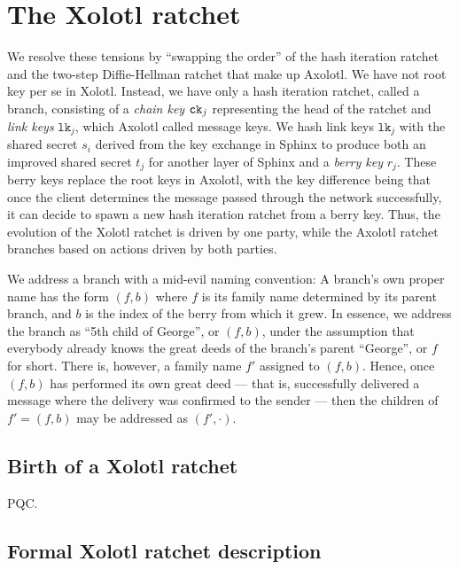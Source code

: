 \documentclass[twoside,letterpaper]{llncs}
\begin{document}
\section{The Xolotl ratchet}

\def\cn{\texttt{cn}}
\def\DH{\texttt{DH}}
\def\lk{\texttt{lk}}
\def\sk{\texttt{sk}}
\def\ECDH{\textrm{ECDH}}

We resolve these tensions by ``swapping the order'' of the hash
iteration ratchet and the two-step Diffie-Hellman ratchet that make
up Axolotl.   
%
We have not root key per se in Xolotl.  
Instead, we have only a hash iteration ratchet, called a branch,
consisting of a {\it chain key} $\texttt{ck}_j$ representing the head of the
ratchet and {\it link keys} $\lk_j$, which Axolotl called message
keys.  We hash link keys $\lk_j$ with the shared secret $s_i$
derived from the key exchange in Sphinx to produce both an improved
shared secret $t_j$ for another layer of Sphinx and a {\it berry key} $r_j$. 
These berry keys replace the root keys in Axolotl, with the key difference
being that once the
client determines the message passed through the network successfully,
it can decide to spawn a new hash iteration ratchet from a berry key.
Thus, the evolution of the Xolotl ratchet is driven by one party, while
the Axolotl ratchet branches based on actions driven by both parties.

We address a branch with a mid-evil naming convention: A branch's own
proper name has the form $(f,b)$ where $f$ is its family name
determined by its parent branch, and $b$ is the index of the berry
from which it grew.  In essence, we address the branch as ``5th child
of George'', or $(f,b)$, under the assumption that everybody already
knows the great deeds of the branch's parent ``George'', or $f$ for
short.  There is, however, a family name $f'$ assigned to $(f,b)$.
Hence, once $(f,b)$ has performed its own great deed --- that is,
successfully delivered a message where the delivery was confirmed to
the sender --- then the children of $f' = (f,b)$ may be addressed as
$(f',\cdot)$.

\subsection{Birth of a Xolotl ratchet}

PQC.


\subsection{Formal Xolotl ratchet description} 
\end{document}
